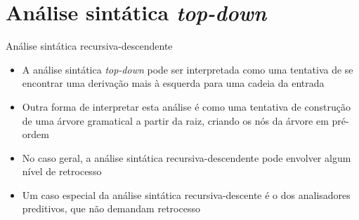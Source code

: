 \section{Análise sintática {\it top-down}}

\begin{frame}[fragile]{Análise sintática recursiva-descendente}

    \begin{itemize}
        \item A análise sintática \textit{top-down} pode ser interpretada como uma tentativa de se encontrar uma derivação mais à esquerda para uma cadeia da
            entrada
        \pause

        \item Outra forma de interpretar esta análise é como uma tentativa de construção de uma árvore gramatical a partir da raiz, criando os nós da árvore
            em pré-ordem
        \pause

        \item No caso geral, a análise sintática recursiva-descendente pode envolver algum nível de retrocesso
        \pause

        \item Um caso especial da análise sintática recursiva-descente é o dos analisadores preditivos, que não demandam retrocesso
    \end{itemize}

\end{frame}

